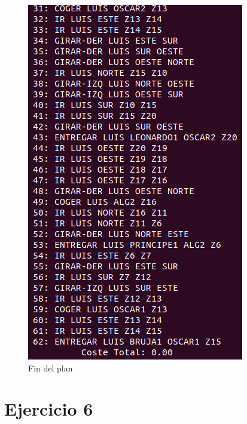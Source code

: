 \begin{figure}[H]
\begin{minipage}[b]{0.5\linewidth}
		\includegraphics[width=\linewidth]{ej5-2.png}
		\caption{Fin del plan}
		\label{fig:ej5-2}
	\end{minipage}
\end{figure}

\section{Ejercicio 6}


